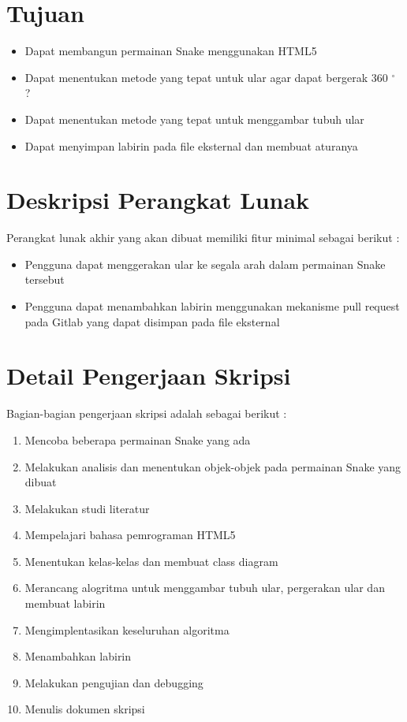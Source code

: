 \documentclass[11pt]{article}
\begin{document}
\section{Tujuan}
\begin{itemize}
\item Dapat membangun permainan Snake menggunakan HTML5
\item Dapat menentukan metode yang tepat untuk ular agar dapat bergerak 360 $^{\circ}$ ?
\item Dapat menentukan metode yang tepat untuk menggambar tubuh ular
\item Dapat menyimpan labirin pada file eksternal dan membuat aturanya
\end{itemize}

\section{Deskripsi Perangkat Lunak}
Perangkat lunak akhir yang akan dibuat memiliki fitur minimal sebagai berikut : 
\begin{itemize}
\item Pengguna dapat menggerakan ular ke segala arah dalam permainan Snake tersebut
\item Pengguna dapat menambahkan labirin menggunakan mekanisme pull request pada Gitlab yang dapat disimpan pada file eksternal
\end{itemize}

\section{Detail Pengerjaan Skripsi}
Bagian-bagian pengerjaan skripsi adalah sebagai berikut : 
\begin{enumerate}
\item Mencoba beberapa permainan Snake yang ada
\item Melakukan analisis dan menentukan objek-objek pada permainan Snake yang dibuat
\item Melakukan studi literatur 
\item Mempelajari bahasa pemrograman HTML5
\item Menentukan kelas-kelas dan membuat class diagram 
\item Merancang alogritma untuk menggambar tubuh ular, pergerakan ular dan membuat labirin
\item Mengimplentasikan keseluruhan algoritma 
\item Menambahkan labirin
\item Melakukan pengujian dan debugging
\item Menulis dokumen skripsi
\end{enumerate}
\end{document}
